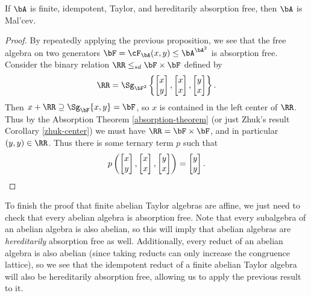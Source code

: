 \begin{thm}\label{haf-malcev} If $\bA$ is finite, idempotent, Taylor, and hereditarily absorption free, then $\bA$ is Mal'cev.
\end{thm}
\begin{proof} By repeatedly applying the previous proposition, we see that the free algebra on two generators $\bF = \cF_{\bA}(x,y) \le \bA^{\bA^2}$ is absorption free. Consider the binary relation $\RR \le_{sd} \bF\times \bF$ defined by
\[
\RR = \Sg_{\bF^2}\left\{\begin{bmatrix} x\\ y\end{bmatrix}, \begin{bmatrix} x\\ x\end{bmatrix}, \begin{bmatrix} y\\ x\end{bmatrix}\right\}.
\]
Then $x+\RR \supseteq \Sg_\bF\{x,y\} = \bF$, so $x$ is contained in the left center of $\RR$. Thus by the Absorption Theorem \ref{absorption-theorem} (or just Zhuk's result Corollary \ref{zhuk-center}) we must have $\RR = \bF \times \bF$, and in particular $(y,y) \in \RR$. Thus there is some ternary term $p$ such that
\[
p\left(\begin{bmatrix} x\\ y\end{bmatrix}, \begin{bmatrix} x\\ x\end{bmatrix}, \begin{bmatrix} y\\ x\end{bmatrix}\right) = \begin{bmatrix} y\\ y\end{bmatrix}.\qedhere
\]
\end{proof}

To finish the proof that finite abelian Taylor algebras are affine, we just need to check that every abelian algebra is absorption free. Note that every subalgebra of an abelian algebra is also abelian, so this will imply that abelian algebras are \emph{hereditarily} absorption free as well. Additionally, every reduct of an abelian algebra is also abelian (since taking reducts can only increase the congruence lattice), so we see that the idempotent reduct of a finite abelian Taylor algebra will also be hereditarily absorption free, allowing us to apply the previous result to it.

